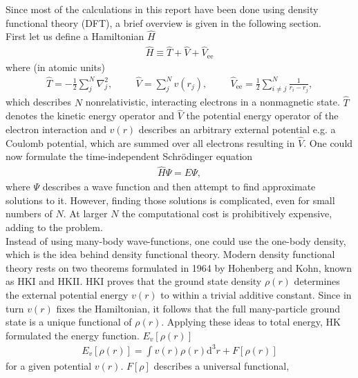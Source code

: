 Since most of the calculations in this report have been done using density functional theory (DFT), a brief overview is given in the following section.\\
First let us define a Hamiltonian $\hat{H}$ 
\begin{align}
    \hat{H} \equiv \hat{T} + \hat{V} + \hat{V}_{\mathrm{ee}}
\end{align}
where (in atomic units)
\begin{align}
    \hat{T} = -\frac{1}{2}\sum^{N}_{j}\nabla_{j}^2, \hspace{1cm} \hat{V} = \sum^{N}_{j}v(r_j), \hspace{1cm} \hat{V}_{\mathrm{ee}} = \frac{1}{2} \sum^{N}_{i\neq j}\frac{1}{r_i - r_j},
\end{align} 
which describes $N$ nonrelativistic, interacting electrons in a nonmagnetic state. $\hat{T}$ denotes the kinetic energy operator and $\hat{V}$ the potential energy operator of the electron interaction and $v(r)$ describes an arbitrary external potential e.g. a Coulomb potential, which are summed over all electrons resulting in $\hat{V}$. \cite{DFT_1} One could now formulate the time-independent Schrödinger equation 
\begin{align}
    \hat{H}\Psi = E\Psi,
\end{align}
where $\Psi$ describes a wave function and then attempt to find approximate solutions to it. However, finding those solutions is complicated, even for small numbers of $N$. At larger $N$ the computational cost is prohibitively expensive, adding to the problem.\\
Instead of using many-body wave-functions, one could use the one-body density, which is the idea behind density functional theory. Modern density functional theory rests on two theorems formulated in 1964 by Hohenberg and Kohn, known as HKI and HKII. HKI proves that the ground state density $\rho(r)$ determines the external potential energy $v(r)$ to within a trivial additive constant. Since in turn $v(r)$ fixes the Hamiltonian, it follows that the full many-particle ground state is a unique functional of $\rho(r)$.\cite{DFT_2} Applying these ideas to total energy, HK formulated the energy function. $E_{v}[\rho(r)]$ 
\begin{align} \label{eq:energy_func}
    E_{v}[\rho(r)] = \int v(r) \rho(r) \mathrm{d}^{3}r + F[\rho(r)] 
\end{align}
for a given potential $v(r)$. $F[\rho]$ describes a universal functional, 
